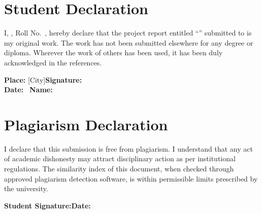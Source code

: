 \chapter*{Student Declaration}
\thispagestyle{empty}
\vspace{1cm}
\noindent I, \textbf{\StudentName}, Roll No.~\textbf{\StudentRoll}, hereby declare that the project report entitled ``\ThesisTitle'' submitted to \textbf{\UniversityName} is my original work. The work has not been submitted elsewhere for any degree or diploma. Wherever the work of others has been used, it has been duly acknowledged in the references.

\vspace{2cm}
\noindent\textbf{Place:} [City]\hfill\textbf{Signature:}\\
\textbf{Date:} \SubmissionMonth\ \SubmissionYear\hfill\textbf{Name:} \StudentName

\clearpage
\chapter*{Plagiarism Declaration}
\thispagestyle{empty}
\vspace{1cm}
\noindent I declare that this submission is free from plagiarism. I understand that any act of academic dishonesty may attract disciplinary action as per institutional regulations. The similarity index of this document, when checked through approved plagiarism detection software, is within permissible limits prescribed by the university.

\vspace{2cm}
\noindent\textbf{Student Signature:}\hfill\textbf{Date:} \SubmissionMonth\ \SubmissionYear
